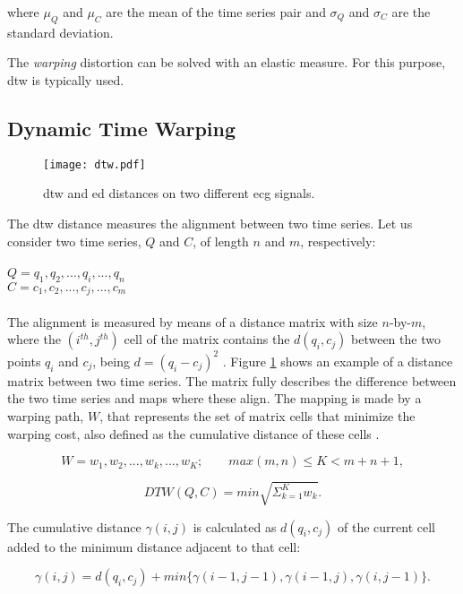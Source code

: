 where $\mu_Q$ and $\mu_C$ are the mean of the time series pair and $\sigma_Q$ and $\sigma_C$ are the standard deviation.

The \textit{warping} distortion can be solved with an elastic measure. For this purpose, \gls{dtw} is typically used.

\subsection{Dynamic Time Warping}
\label{subsec:dtw}

\begin{figure}
\centering
\texttt{[image: dtw.pdf]}
\caption{\gls{dtw} and \gls{ed} distances on two different \gls{ecg} signals.}
\label{fig:dtw_intro}
\end{figure}

The \gls{dtw} distance measures the alignment between two time series. Let us consider two time series, $Q$ and $C$, of length $n$ and $m$, respectively:\\
\\
$Q = q_1, q_2, ..., q_i, ..., q_n$\\
$C = c_1, c_2, ..., c_j, ..., c_m$\\
\\
The alignment is measured by means of a distance matrix with size $n$-by-$m$, where the $(i^{th},j^{th})$ cell of the matrix contains the $d(q_i, c_j)$ between the two points $q_i$ and $c_j$, being $d=(q_i - c_j)^2$ \cite{dtw}. Figure \ref{fig:dtw_intro} shows an example of a distance matrix between two time series. The matrix fully describes the difference between the two time series and maps where these align. The mapping is made by a warping path, $W$, that represents the set of matrix cells that minimize the warping cost, also defined as the cumulative distance of these cells \cite{dtw}.

\begin{equation}
W = w_1, w_2, ..., w_k, ..., w_K; \quad \quad max(m,n) \leq K < m+n+1,
\end{equation} 

\begin{equation}
DTW(Q,C) = min \sqrt{\Sigma^K_{k=1} w_k}.
\end{equation} 

The cumulative distance $\gamma(i,j)$ is calculated as $d(q_i,c_j)$ of the current cell added to the minimum distance adjacent to that cell:

\begin{equation}
\gamma(i,j) = d(q_i,c_j)+min\{\gamma(i-1,j-1), \gamma(i-1, j), \gamma(i, j-1)\}.
\end{equation} 

